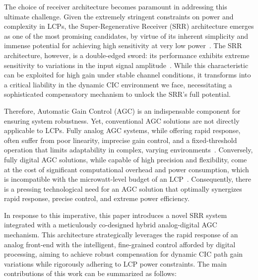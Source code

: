 \documentclass[journal]{IEEEtran}
\begin{document}
The choice of receiver architecture becomes paramount in addressing this ultimate challenge. Given the extremely stringent constraints on power and complexity in LCPs, the Super-Regenerative Receiver (SRR) architecture emerges as one of the most promising candidates, by virtue of its inherent simplicity and immense potential for achieving high sensitivity at very low power~\cite{frey2013improved,macfarlane1948theory}. The SRR architecture, however, is a double-edged sword: its performance exhibits extreme sensitivity to variations in the input signal amplitude~\cite{chen2007fully,vidojkovic20112}. While this characteristic can be exploited for high gain under stable channel conditions, it transforms into a critical liability in the dynamic CIC environment we face, necessitating a sophisticated compensatory mechanism to unlock the SRR's full potential.

Therefore, Automatic Gain Control (AGC) is an indispensable component for ensuring system robustness. Yet, conventional AGC solutions are not directly applicable to LCPs. Fully analog AGC systems, while offering rapid response, often suffer from poor linearity, imprecise gain control, and a fixed-threshold operation that limits adaptability in complex, varying environments~\cite{Zhao2023AnAF}. Conversely, fully digital AGC solutions, while capable of high precision and flexibility, come at the cost of significant computational overhead and power consumption, which is incompatible with the microwatt-level budget of an LCP~\cite{Li2020DigitalAC}. Consequently, there is a pressing technological need for an AGC solution that optimally synergizes rapid response, precise control, and extreme power efficiency.

In response to this imperative, this paper introduces a novel SRR system integrated with a meticulously co-designed hybrid analog-digital AGC mechanism. This architecture strategically leverages the rapid response of an analog front-end with the intelligent, fine-grained control afforded by digital processing, aiming to achieve robust compensation for dynamic CIC path gain variations while rigorously adhering to LCP power constraints. The main contributions of this work can be summarized as follows:
\end{document}
